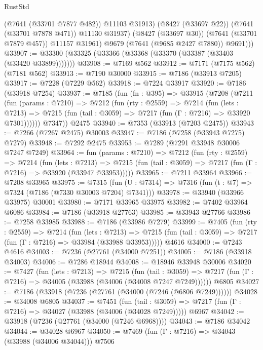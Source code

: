\begin{lexlean}{RustStd}
\begin{coremodule}
                (@7641 (@33701 @7877 @482))
                @11103
                @31913)
              (@8427 (@33697 @22))
              (@7641 (@33701 @7878 @471))
              @11130
              @31937)
            (@8427 (@33697 @30))
            (@7641 (@33701 @7879 @457))
            @11157
            @31961)
          @9679
          (@7641 (@9685 @2427 @7880))
          @9691)))
@33907 := @33300 (@33325 (@33366 (@33368 (@33370 (@33387 (@33403 (@33420 @33899)))))))
@33908 := @7169 @562
@33912 := @7171 (@7175 @562) (@7181 @562)
@33913 := @7190 @30000
@33915 := @7186 (@33913 @7205)
@33917 := @7228 (@7229 @562)
@33918 := @7224 @33917
@33920 := @7186 (@33918 @7254)
@33937 := @7185
    (fun (fn : @395) =>
    @33915
      (@7208
        (@7211
          (fun (params : @7210) =>
          @7212
            (fun (rty : @2559) =>
            @7214
              (fun (lets : @7213) =>
              @7215 (fun (tail : @3059) => @7217 (fun (Γ : @7216) => @33920 @7301))))))
        @7347))
    @2475
@33940 := @7353 (@33913 (@7203 @2475))
@33943 := @7266 (@7267 @2475) @30003
@33947 := @7186 (@7258 (@33943 @7275) @7279)
@33948 := @7292 @2475
@33953 := @7289 (@7291 @33948 @30006 @7247 @7249)
@33964 := fun (params : @7210) =>
  @7212
    (fun (rty : @2559) =>
    @7214
      (fun (lets : @7213) =>
      @7215 (fun (tail : @3059) => @7217 (fun (Γ : @7216) => @33920 (@33947 @33953)))))
@33965 := @7211 @33964
@33966 := @7208 @33965
@33975 := @7315
    (fun (U : @7314) => @7316 (fun (t : @7) => @7324 (@7186 (@7330 @30003 @7204) @7341)))
@33978 := @33940 (@33966 @33975) @30001
@33980 := @7171 @33965 @33975
@33982 := @7402 @33964 @6086
@33984 := @7186 (@33918 @27763)
@33985 := @33943 @27766
@33986 := @7258 @33985
@33988 := @7186 (@33986 @7279)
@33999 := @7405
    (fun (rty : @2559) =>
    @7214
      (fun (lets : @7213) =>
      @7215 (fun (tail : @3059) => @7217 (fun (Γ : @7216) => @33984 (@33988 @33953)))))
    @4616
@34000 := @7243 @4616
@34003 := @7236 (@27761 (@34000 @7251))
@34005 := @7186 (@33918 @34003)
@34006 := @7286 @18944
@34008 := @18946 @33948 @30006
@34020 := @7427
    (fun (lets : @7213) =>
    @7215
      (fun (tail : @3059) =>
      @7217 (fun (Γ : @7216) => @34005 (@33988 (@34006 (@34008 @7247 @7249))))))
    @6805
@34027 := @7186 (@33918 (@7236 (@27761 (@34000 (@7246 (@6806 @7249))))))
@34028 := @34008 @6805
@34037 := @7451
    (fun (tail : @3059) => @7217 (fun (Γ : @7216) => @34027 (@33988 (@34006 (@34028 @7249)))))
    @6967
@34042 := @33918 (@7236 (@27761 (@34000 (@7246 @6968))))
@34043 := @7186 @34042
@34044 := @34028 @6967
@34050 := @7469 (fun (Γ : @7216) => @34043 (@33988 (@34006 @34044))) @7506

\end{coremodule}
\end{lexlean}
